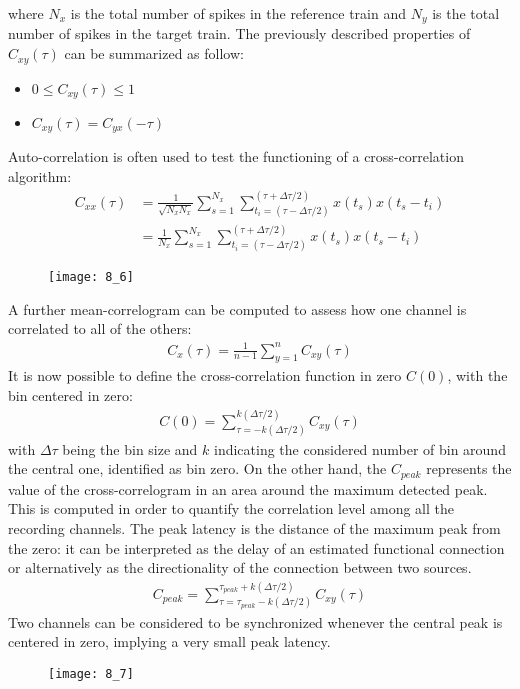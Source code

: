 where \(N_x\) is the total number of spikes in the reference train and \(N_y\) is the
total number of spikes in the target train. The previously described properties of
\(C_{xy}(\tau)\) can be summarized as follow:
\begin{itemize}
    \item \(0\le{C_{xy}(\tau)}\le{1}\)
    \item \(C_{xy}(\tau)=C_{yx}(-\tau)\)
\end{itemize}
Auto-correlation is often used to test the functioning of a cross-correlation
algorithm:
\begin{align*}
    C_{xx}(\tau)
     & =\frac{1}{\sqrt{N_xN_x}}\sum_{s=1}^{N_x}\sum_{t_{i}=(\tau-\Delta{\tau}/2)}^{(\tau+\Delta{\tau}/2)}x(t_s)x(t_s-t_i) \\
     & =\frac{1}{N_x}\sum_{s=1}^{N_x}\sum_{t_{i}=(\tau-\Delta{\tau}/2)}^{(\tau+\Delta{\tau}/2)}x(t_s)x(t_s-t_i)
\end{align*}
\begin{figure}[H]
    \texttt{[image: 8\_6]}
    \centering
\end{figure}
A further mean-correlogram can be computed to assess how one channel is correlated
to all of the others:
\begin{align*}
    C_x(\tau)=\frac{1}{n-1}\sum_{y=1}^{n}C_{xy}(\tau)
\end{align*}
It is now possible to define the cross-correlation function in zero \(C(0)\), with
the bin centered in zero:
\begin{align*}
    C(0)=\sum_{\tau=-k(\Delta\tau/2)}^{k(\Delta\tau/2)}C_{xy}(\tau)
\end{align*}
with \(\Delta\tau\) being the bin size and \(k\) indicating the considered number of
bin around the central one, identified as bin zero.
On the other hand, the \(C_{peak}\) represents the value of the cross-correlogram in
an area around the maximum detected peak. This is computed in order to quantify the
correlation level among all the recording channels. The peak latency is the distance
of the maximum peak from the zero: it can be interpreted as the delay of an
estimated functional connection or alternatively as the directionality of
the connection between two sources.
\begin{align*}
    C_{peak}=\sum_{\tau=\tau_{peak}-k(\Delta\tau/2)}^{\tau_{peak}+k(\Delta\tau/2)}C_{xy}(\tau)
\end{align*}
Two channels can be considered to be synchronized whenever the central peak is
centered in zero, implying a very small peak latency.
\begin{figure}[H]
    \texttt{[image: 8\_7]}
    \centering
\end{figure}

